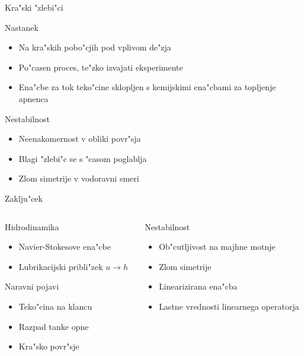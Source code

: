 \documentclass{beamer}
\begin{document}
\begin{frame}{Kra"ski "zlebi"ci}
  \begin{block}{Nastanek}
  \begin{itemize}
    \item Na kra"skih pobo"cjih pod vplivom de"zja
    \item Po"casen proces, te"zko izvajati eksperimente
    \item Ena"cbe za tok teko"cine sklopljen s kemijskimi ena"cbami za topljenje apnenca
    \end{itemize}
  \end{block}
  
  \begin{block}{Nestabilnost}
  \begin{itemize}
    \item Neenakomernost v obliki povr"sja
    \item Blagi "zlebi"c se s "casom poglablja
    \item Zlom simetrije v vodoravni smeri
    \end{itemize}
  \end{block}
\end{frame}

\begin{frame}{Zaklju"cek}
\begin{columns}
 \begin{column}{0.45\textwidth}
  \begin{block}{Hidrodinamika}
  \begin{itemize}
   \item Navier-Stokesove ena"cbe
   \item Lubrikacijski pribli"zek $u \rightarrow h$
  \end{itemize}
  \end{block}
  
  \begin{block}{Naravni pojavi}
    \begin{itemize}
     \item Teko"cina na klancu
     \item Razpad tanke opne
     \item Kra"sko povr"sje
    \end{itemize}
 \end{block}
 \end{column}
 
\begin{column}{0.45\textwidth}
  \begin{block}{Nestabilnost}
   \begin{itemize}
    \item Ob"cutljivost na majhne motnje
    \item Zlom simetrije
    \item Linearizirana ena"cba
    \item Lastne vrednosti linearnega operatorja
   \end{itemize}
  \end{block}

 \end{column}

\end{columns}

\end{frame}
\end{document}
